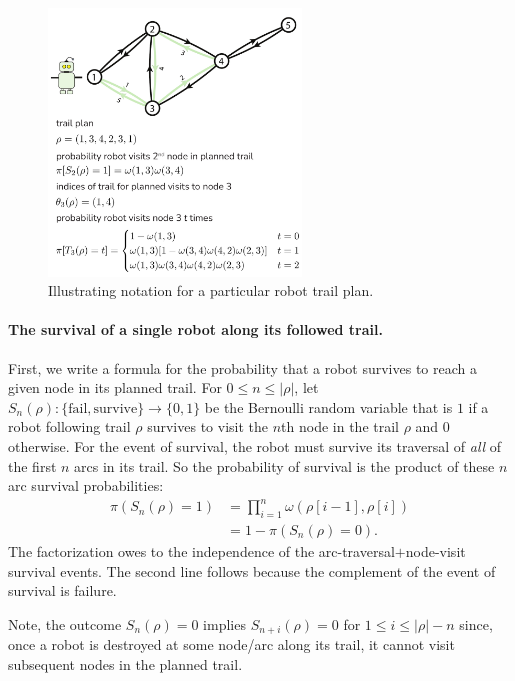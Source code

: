 \documentclass[11pt, oneside]{article}
\begin{document}
\begin{figure}[h!]
    \centering
    	\includegraphics[width=0.6\textwidth]{drawings/notation_fig/notation.pdf}
    \caption{Illustrating notation for a particular robot trail plan.} \label{fig:notation}
\end{figure}

\paragraph{The survival of a single robot along its followed trail.} First, we write a formula for the probability that a robot survives to reach a given node in its planned trail.
For $0 \leq n \leq \lvert \rho \rvert$, let $S_n(\rho) : \{\text{fail}, \text{survive}\} \rightarrow \{0, 1\} $ be the Bernoulli random variable that is $1$ if a robot following trail $\rho$ survives to visit the $n$th node in the trail $\rho$ and $0$ otherwise. For the event of survival, the robot must survive its traversal of \emph{all} of the first $n$ arcs in its trail. So the probability of survival is the product of these $n$ arc survival probabilities:
\begin{align}
	\pi(S_n(\rho) = 1) & = \prod_{i=1}^n \omega(\rho[i-1], \rho[i]) \label{eq:pi_S_n} \\ %
	& = 1 - \pi(S_n(\rho) = 0).
\end{align} The factorization owes to the independence of the arc-traversal$+$node-visit survival events.
The second line follows because the complement of the event of survival is failure.

Note, the outcome $S_n(\rho)=0$ implies $S_{n+i}(\rho)=0$ for $1 \leq i \leq \lvert \rho \rvert-n$ since, once a robot is destroyed at some node/arc along its trail, it cannot visit subsequent nodes in the planned trail.
\end{document}
